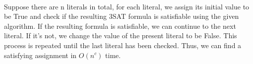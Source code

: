 \begin{problem}{3} ~\\
Suppose there are n literals in total, for each literal, we assign its initial value to be True and check if the resulting 3SAT formula is satisfiable using the given algorithm. If the resulting formula is satisfiable, we can continue to the next literal. If it's not, we change the value of the present literal to be False. This process is repeated until the last literal has been checked. Thus, we can find a satisfying assignment in $O(n^c)$ time.
\end{problem}